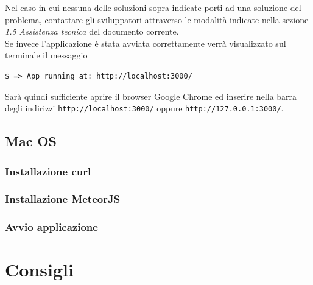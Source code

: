 \noindent Nel caso in cui nessuna delle soluzioni sopra indicate porti ad una soluzione del problema, contattare gli sviluppatori attraverso le modalità indicate nella sezione \emph{1.5 Assistenza tecnica} del documento corrente.\\

Se invece l'applicazione è stata avviata correttamente verrà visualizzato sul terminale il messaggio 

\begin{lstlisting}[style=DOS]
	$ => App running at: http://localhost:3000/
\end{lstlisting}

Sarà quindi sufficiente aprire il browser Google Chrome ed inserire nella barra degli indirizzi \verb+http://localhost:3000/+ oppure \verb+http://127.0.0.1:3000/+.


\subsection{Mac OS}
\subsubsection{Installazione curl}

\subsubsection{Installazione MeteorJS}

\subsubsection{Avvio applicazione}

\section{Consigli}